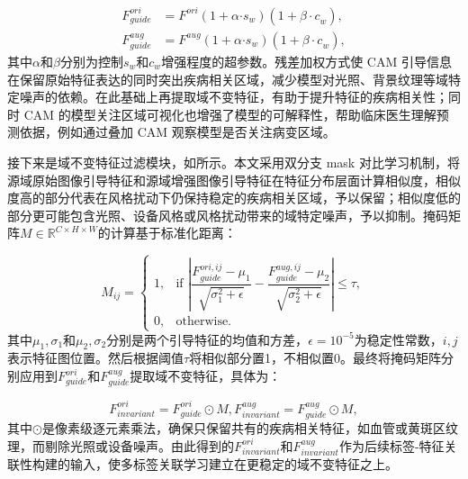 \begin{align}
F_{guide}^{ori} &= F^{ori}(1 + \alpha{\cdot s}_{w})(1 + {\beta \cdot c}_{w}), \label{eq:guide-feature-ori} \\
F_{guide}^{aug} &= F^{aug}(1 + \alpha{\cdot s}_{w})(1 + {\beta \cdot c}_{w}), \label{eq:guide-feature-aug}
\end{align}
其中\(\alpha\)和\(\beta\)分别为控制\(s_{w}\)和\(c_{w}\)增强程度的超参数。残差加权方式使 CAM 引导信息在保留原始特征表达的同时突出疾病相关区域，减少模型对光照、背景纹理等域特定噪声的依赖。在此基础上再提取域不变特征，有助于提升特征的疾病相关性；同时 CAM 的模型关注区域可视化也增强了模型的可解释性，帮助临床医生理解预测依据，例如通过叠加 CAM 观察模型是否关注病变区域。

接下来是域不变特征过滤模块，如所示。本文采用双分支 mask 对比学习机制，将源域原始图像引导特征和源域增强图像引导特征在特征分布层面计算相似度，相似度高的部分代表在风格扰动下仍保持稳定的疾病相关区域，予以保留；相似度低的部分更可能包含光照、设备风格或风格扰动带来的域特定噪声，予以抑制。掩码矩阵\(M \in \mathbb{R}^{C \times H \times W}\)的计算基于标准化距离：

\begin{equation}\label{eq:mask}
M_{ij} =
\left\{
\begin{array}{ll}
1, & \text{if } \left| \dfrac{F_{guide}^{ori,ij} - \mu_{1}}{\sqrt{\sigma_{1}^{2} + \epsilon}} - \dfrac{F_{guide}^{aug,ij} - \mu_{2}}{\sqrt{\sigma_{2}^{2} + \epsilon}} \right| \leq \tau, \\
0, & \text{otherwise.}
\end{array}
\right.
\end{equation}
其中\(\mu_{1},\sigma_{1}\)和\(\mu_{2},\sigma_{2}\)分别是两个引导特征的均值和方差，\(\epsilon = 10^{-5}\)为稳定性常数，\(i,j\)表示特征图位置。然后根据阈值\(\tau\)将相似部分置1，不相似置0。最终将掩码矩阵分别应用到\(F_{guide}^{ori}\)和\(F_{guide}^{aug}\)提取域不变特征，具体为：

\begin{equation}\label{eq:invariant-feature}
F_{invariant}^{ori} = F_{guide}^{ori} \odot M,F_{invariant}^{aug} = F_{guide}^{aug} \odot M,
\end{equation}
其中\(\odot\)是像素级逐元素乘法，确保只保留共有的疾病相关特征，如血管或黄斑区纹理，而剔除光照或设备噪声。由此得到的\(F_{invariant}^{ori}\)和\(F_{invariant}^{aug}\)作为后续标签-特征关联性构建的输入，使多标签关联学习建立在更稳定的域不变特征之上。


